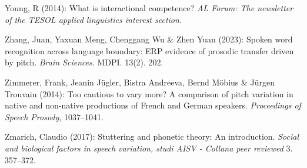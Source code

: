 \begin{styleBibliography}
Young, R (2014): What is interactional competence? \textit{AL Forum: The newsletter of the TESOL applied linguistics interest section}.
\end{styleBibliography}

\begin{styleBibliography}
Zhang, Juan, Yaxuan Meng, Chenggang Wu \& Zhen Yuan (2023): Spoken word recognition across language boundary: ERP evidence of prosodic transfer driven by pitch. \textit{Brain Sciences}. MDPI. 13(2). 202.
\end{styleBibliography}

\begin{styleBibliography}
Zimmerer, Frank, Jeanin Jügler, Bistra Andreeva, Bernd Möbius \& Jürgen Trouvain (2014): Too cautious to vary more? A comparison of pitch variation in native and non-native productions of French and German speakers. \textit{Proceedings of Speech Prosody}, 1037–1041.
\end{styleBibliography}

\begin{styleBibliography}
Zmarich, Claudio (2017): Stuttering and phonetic theory: An introduction. \textit{Social and biological factors in speech variation, studi AISV - Collana peer reviewed} 3. 357–372.
\end{styleBibliography}

\begin{stylecaption}

\end{stylecaption}
